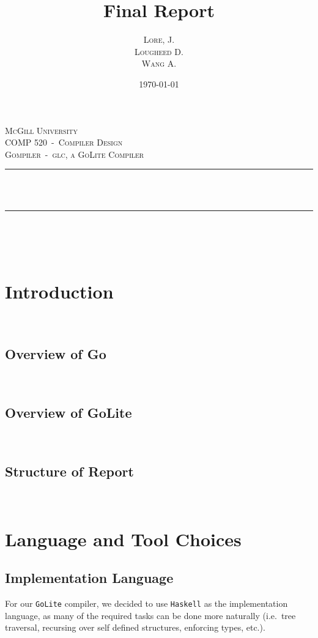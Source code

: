 \documentclass[11pt]{article}
\author{\textsc{Lore}, J.\\ \textsc{Lougheed} D.\\ \textsc{Wang} A.}
\date{\today}
\title{Final Report}
\newcommand{\HRule}{\rule{\linewidth}{0.5mm}}
\begin{document}
\begin{titlepage}
	\center%

	\textsc{\LARGE McGill University}\\[1.5cm]
	\textsc{\Large COMP 520~-~Compiler Design}\\[0.5cm]
	\textsc{\large Gompiler~-~glc, a GoLite Compiler}\\[0.5cm]

	\HRule~\\[0.4cm]
	{ \huge \bfseries \thetitle}\\[0.4cm]
	\HRule~\\[1.5cm]

	\theauthor\\%
	[3cm]

	{\large \thedate}\\[2cm]

	\vfill

\end{titlepage}
\tableofcontents
\section{Introduction}~%
\subsection{Overview of Go}~%
\subsection{Overview of GoLite}~%
\subsection{Structure of Report}~%
\section{Language and Tool Choices}
\subsection{Implementation Language}
For our \texttt{GoLite} compiler, we decided to use \texttt{Haskell} as the
implementation language, as many of the required tasks can be done
more naturally (i.e.\ tree traversal, recursing over self defined
structures, enforcing types, etc.).
\end{document}
